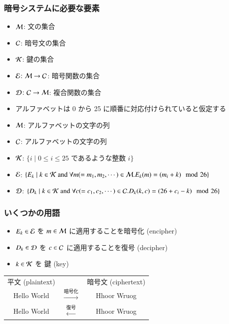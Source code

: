 \begin{frame}
\frametitle{暗号システムに必要な要素}
  \begin{itemize}
\item $\cal M$: 文の集合
\item $\cal C$: 暗号文の集合
\item $\cal K$: 鍵の集合
\item \(\cal E\colon M\rightarrow C\): 暗号関数の集合
\item \(\cal D\colon C\rightarrow M\): 複合関数の集合
  \end{itemize}
  \begin{example}
\scriptsize
    \begin{itemize}
\item アルファベットは 0 から 25 に順番に対応付けられていると仮定する
\item $\cal M$: アルファベットの文字の列
\item $\cal C$: アルファベットの文字の列
\item $\cal K$: \(\{i\mid 0\leq i\leq 25\) であるような整数 $i\}$
\item \(\cal E\): \(\{E_k\mid k\in{\cal K}\ \mbox{and}\ \forall m(=m_1,m_2,\cdots)\in {\cal M}.E_k(m)=(m_i+k)\mod 26\}\)
\item \(\cal D\): \(\{D_k\mid k\in{\cal K}\ \mbox{and}\ \forall c(=c_1,c_2,\cdots)\in {\cal C}.D_k(k,c)=(26+c_i-k)\mod 26\}\)
    \end{itemize}
  \end{example}
\end{frame}
\begin{frame}
\frametitle{いくつかの用語}
  \begin{itemize}
\item \(E_k\in{\cal E}\) を \(m\in{\cal M}\) に適用することを暗号化 (encipher)
\item \(D_k\in{\cal D}\) を \(c\in{\cal C}\) に適用することを復号 (decipher)
\item \(k\in{\cal K}\) を 鍵 (key)
  \end{itemize}
  \begin{center}
    \begin{tabular}{ccc}
平文 (plaintext)&&暗号文 (ciphertext)\\
Hello World&$\stackrel{\mbox{暗号化}}{\rightarrow}$&Hhoor Wruog\\
Hello World&$\stackrel{\mbox{復号}}{\leftarrow}$&Hhoor Wruog
    \end{tabular}
  \end{center}
\end{frame}
